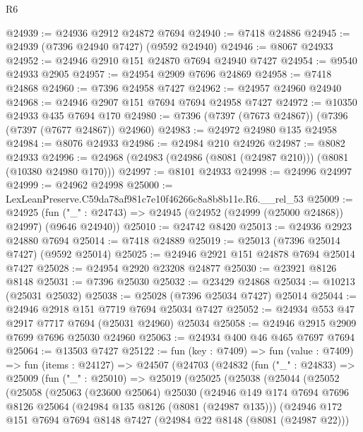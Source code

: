 \begin{lexlean}{R6}
\begin{coremodule}
@24939 := @24936 @2912 @24872 @7694
@24940 := @7418 @24886
@24945 := @24939 (@7396 @24940 @7427) (@9592 @24940)
@24946 := @8067 @24933
@24952 := @24946 @2910 @151 @24870 @7694 @24940 @7427
@24954 := @9540 @24933 @2905
@24957 := @24954 @2909 @7696 @24869
@24958 := @7418 @24868
@24960 := @7396 @24958 @7427
@24962 := @24957 @24960 @24940
@24968 := @24946 @2907 @151 @7694 @7694 @24958 @7427
@24972 := @10350 @24933 @435 @7694 @170
@24980 := @7396 (@7397 (@7673 @24867)) (@7396 (@7397 (@7677 @24867)) @24960)
@24983 := @24972 @24980 @135 @24958
@24984 := @8076 @24933
@24986 := @24984 @210 @24926
@24987 := @8082 @24933
@24996 := @24968 (@24983 (@24986 (@8081 (@24987 @210))) (@8081 (@10380 @24980 @170)))
@24997 := @8101 @24933
@24998 := @24996 @24997
@24999 := @24962 @24998
@25000 := LexLeanPreserve.C59da78af981c7e10f46266c8a8b8b11e.R6.__rel_53
@25009 := @24925
    (fun ("_" : @24743) => @24945 (@24952 (@24999 (@25000 @24868)) @24997) (@9646 @24940))
@25010 := @24742 @8420
@25013 := @24936 @2923 @24880 @7694
@25014 := @7418 @24889
@25019 := @25013 (@7396 @25014 @7427) (@9592 @25014)
@25025 := @24946 @2921 @151 @24878 @7694 @25014 @7427
@25028 := @24954 @2920 @23208 @24877
@25030 := @23921 @8126 @8148
@25031 := @7396 @25030
@25032 := @23429 @24868
@25034 := @10213 (@25031 @25032)
@25038 := @25028 (@7396 @25034 @7427) @25014
@25044 := @24946 @2918 @151 @7719 @7694 @25034 @7427
@25052 := @24934 @553 @47 @2917 @7717 @7694 (@25031 @24960) @25034
@25058 := @24946 @2915 @2909 @7699 @7696 @25030 @24960
@25063 := @24934 @400 @46 @465 @7697 @7694
@25064 := @13503 @7427
@25122 := fun (key : @7409) =>
  fun (value : @7409) =>
  fun (items : @24127) =>
  @24507
    (@24703
      (@24832
        (fun ("_" : @24833) =>
        @25009
          (fun ("_" : @25010) =>
          @25019
            (@25025
              (@25038
                (@25044
                  (@25052
                    (@25058
                      (@25063
                        (@23600 @25064)
                        @25030
                        (@24946
                          @149
                          @174
                          @7694
                          @7696
                          @8126
                          @25064
                          (@24984 @135 @8126 (@8081 (@24987 @135)))
                          (@24946
                            @172
                            @151
                            @7694
                            @7694
                            @8148
                            @7427
                            (@24984 @22 @8148 (@8081 (@24987 @22)))

\end{coremodule}
\end{lexlean}
